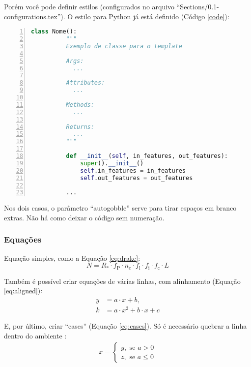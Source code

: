         Porém você pode definir estilos (configurados no arquivo ``Sections/0.1-configurations.tex''). O estilo para Python já está definido (Código \ref{code}):
        \begin{lstlisting}[label=code, language=Python, numbers=left, autogobble]
          class Nome():
          """
          Exemplo de classe para o template
      
          Args:
            ...
      
          Attributes:
            ...
      
          Methods:
            ...
      
          Returns:
            ...
          """
      
          def __init__(self, in_features, out_features):
              super().__init__()
              self.in_features = in_features
              self.out_features = out_features

          ...
        \end{lstlisting}

        Nos dois casos, o parâmetro ``autogobble'' serve para tirar espaços em branco extras. Não há como deixar o código sem numeração.

      \subsubsection{Equações}
        Equação simples, como a Equação \eqref{eq:drake}:
        \begin{equation}
          N = R_* \cdot f_\text{P} \cdot n_e \cdot f_\text{l} \cdot f_\text{i} \cdot f_\text{c} \cdot L
          \label{eq:drake}
        \end{equation}

        Também é possível criar equações de várias linhas, com alinhamento (Equação \eqref{eq:aligned}):
        \begin{align}
          y &= a \cdot x + b, \\
          k &= a \cdot x^2 + b \cdot x + c
          \label{eq:aligned}
        \end{align}

        E, por último, criar ``cases'' (Equação \eqref{eq:cases}). Só é necessário quebrar a linha dentro do ambiente :
        \begin{align}
          x =
          \begin{cases}
            y,\text{ se } a > 0 \\
            z,\text{ se } a \leq 0
          \end{cases}
          \label{eq:cases}
        \end{align}

